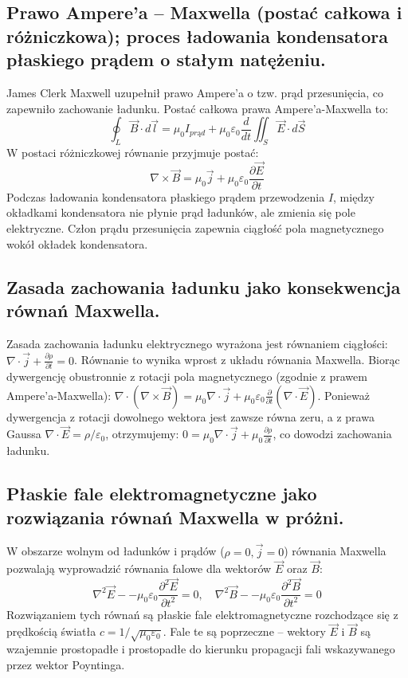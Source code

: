 \documentclass[11pt,a4paper]{article}
\begin{document}
\subsection{Prawo Ampere’a -- Maxwella (postać całkowa i różniczkowa); proces ładowania kondensatora płaskiego prądem o stałym natężeniu.}
James Clerk Maxwell uzupełnił prawo Ampere’a o tzw. prąd przesunięcia, co zapewniło zachowanie ładunku. Postać całkowa prawa Ampere’a-Maxwella to:
\begin{equation}
\oint_L \vec{B} \cdot d\vec{l} = \mu_0 I_{prąd} + \mu_0 \varepsilon_0 \frac{d}{dt}\iint_S \vec{E} \cdot d\vec{S}
\end{equation}
W postaci różniczkowej równanie przyjmuje postać:
\begin{equation}
\nabla \times \vec{B} = \mu_0 \vec{j} + \mu_0 \varepsilon_0 \frac{\partial \vec{E}}{\partial t}
\end{equation}
Podczas ładowania kondensatora płaskiego prądem przewodzenia $I$, między okładkami kondensatora nie płynie prąd ładunków, ale zmienia się pole elektryczne. Człon prądu przesunięcia zapewnia ciągłość pola magnetycznego wokół okładek kondensatora.

\subsection{Zasada zachowania ładunku jako konsekwencja równań Maxwella.}
Zasada zachowania ładunku elektrycznego wyrażona jest równaniem ciągłości: $\nabla \cdot \vec{j} + \frac{\partial \rho}{\partial t} = 0$. Równanie to wynika wprost z układu równania Maxwella. Biorąc dywergencję obustronnie z rotacji pola magnetycznego (zgodnie z prawem Ampere’a-Maxwella): $\nabla \cdot (\nabla \times \vec{B}) = \mu_0 \nabla \cdot \vec{j} + \mu_0 \varepsilon_0 \frac{\partial}{\partial t}(\nabla \cdot \vec{E})$. Ponieważ dywergencja z rotacji dowolnego wektora jest zawsze równa zeru, a z prawa Gaussa $\nabla \cdot \vec{E} = \rho / \varepsilon_0$, otrzymujemy: $0 = \mu_0 \nabla \cdot \vec{j} + \mu_0 \frac{\partial \rho}{\partial t}$, co dowodzi zachowania ładunku.

\subsection{Płaskie fale elektromagnetyczne jako rozwiązania równań Maxwella w próżni.}
W obszarze wolnym od ładunków i prądów ($\rho = 0, \vec{j} = 0$) równania Maxwella pozwalają wyprowadzić równania falowe dla wektorów $\vec{E}$ oraz $\vec{B}$:
\begin{equation}
\nabla^2 \vec{E} -- \mu_0 \varepsilon_0 \frac{\partial^2 \vec{E}}{\partial t^2} = 0, \quad \nabla^2 \vec{B} -- \mu_0 \varepsilon_0 \frac{\partial^2 \vec{B}}{\partial t^2} = 0
\end{equation}
Rozwiązaniem tych równań są płaskie fale elektromagnetyczne rozchodzące się z prędkością światła $c = 1/\sqrt{\mu_0 \varepsilon_0}$. Fale te są poprzeczne -- wektory $\vec{E}$ i $\vec{B}$ są wzajemnie prostopadłe i prostopadłe do kierunku propagacji fali wskazywanego przez wektor Poyntinga.
\end{document}
